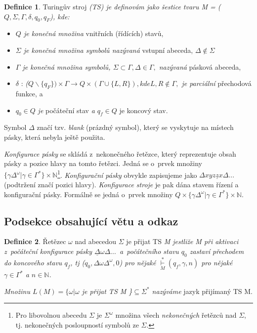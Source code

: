 \documentclass[11pt, twocolumn]{article}
\theoremstyle{definition}
\newtheorem{defn}{\textbf{Definice}}
\begin{document}
\begin{defn} \label{defn:1}
Turingův stroj \textsl{(TS) je definovám jako šestice tvaru M = (${Q, \Sigma, \Gamma, \delta, q_0, q_F}$), kde:}
\begin{itemize}
\setlength\itemsep{0.05em}

    \item \textsl{$Q$ je konečná množina} vnitřních (řídících) stavů,
    
    \item \textsl{$\Sigma$ je konečná množina symbolů nazývaná} vstupní abeceda, ${\Delta \notin \Sigma}$
    
    \item \textsl{$\Gamma$ je konečná množina symbolů, $\Sigma \subset \Gamma, \Delta \in \Gamma,$ nazývaná} pásková abeceda,
    
    \item $\delta$ : \textsl{($Q \backslash \{q_F\}) \times \Gamma \rightarrow Q\times(\Gamma \cup \{L,R\}), kde L, R \notin \Gamma,$ je parciální} přechodová funkce, a
    
    \item ${q_0 \in Q}$ \textsl{je} počáteční stav \textsl{a ${q_f \in Q}$} je koncový stav.
    
\end{itemize}
\end{defn}

Symbol $\Delta$ značí tzv. \textsl{blank} (prázdný symbol), který se vyskytuje na místech pásky, která nebyla ještě použita.
	
\textsl{Konfigurace pásky} se skládá z~nekonečného řetězce, který reprezentuje obsah pásky a pozice hlavy na tomto řetězci. Jedná se o~prvek množiny ${\{\gamma\Delta^\omega | \gamma \in \Gamma^*\} \times \mathbb{N}}$\footnote{Pro libovolnou abecedu $\Sigma$ je $\Sigma^\omega$ množina všech \textsl{nekonečných} řetězců nad $\Sigma$, tj. nekonečných posloupností symbolů ze $\Sigma$.}. \textsl{Konfigurační pásky} obvykle zapisujeme jako $\Delta xyz\underline{z}x\Delta ...$ (podtržení značí pozici hlavy). \textsl{Konfigurace stroje} je pak dána stavem řízení a konfigurační pásky. Formálně se jedná o~prvek množiny ${Q \times \{\gamma\Delta^\omega | \gamma \in \Gamma^* \} \times \mathbb{N}}$.

\subsection{Podsekce obsahující větu a odkaz}

\begin{defn} \label{defn:2}
Řetězec $\omega$ nad abecedou $\Sigma$ je přijat TS \textsl{M jestliže M při aktivaci z~počáteční konfigurace pásky $\underline{\Delta} \omega \Delta ...$~a~počátečního stavu $q_0$ zastaví přechodem do koncového stavu $q_f$, tj ($q_0,\Delta \omega \Delta^\omega, 0$) pro nějaké $\underset{M}{\overset{*}{\vdash}}(q_f, \gamma, n)$ pro nějaké $\gamma \in \Gamma^*$ a $n \in \mathbb{N} $.}

\textsl{Množinu ${L(M) = \{ \omega | \omega }$ je přijat TS M \}${\subseteq \Sigma^*}$ nazýváme} jazyk přijímaný TS M.
\end{defn}
\end{document}

